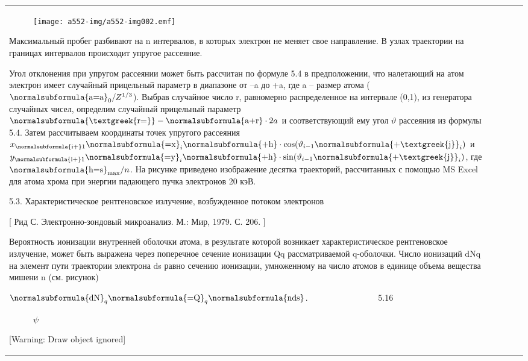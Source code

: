 \documentclass[a4paper,14pt, openany, twoside, draft]{extbook} %
\begin{document}
\begin{flushleft}
\begin{supertabular}{|m{1.7279999cm}|m{1.522cm}|m{1.522cm}|m{1.522cm}|m{1.744cm}|}
\begin{figure}
\centering
\texttt{[image: a552-img/a552-img002.emf]}
\end{figure}
Максимальный пробег разбивают на n интервалов, в которых электрон не меняет свое направление. В узлах траектории на границах интервалов происходит упругое рассеяние.

Угол отклонения при упругом рассеянии может быть рассчитан по формуле 5.4 в предположении, что налетающий на атом электрон имеет случайный прицельный параметр в диапазоне от –a до +a, где a – размер атома ( $\normalsubformula{\text{a=a}}_0/Z^{1/3}$). Выбрав случайное число r, равномерно распределенное на интервале (0,1), из генератора случайных чисел, определим случайный прицельный параметр  $\normalsubformula{\text{\textgreek{r=}}}-\normalsubformula{\text{a+r}}\cdot 2a$ и соответствующий ему угол  $\vartheta $ рассеяния из формулы 5.4. Затем рассчитываем координаты точек упругого рассеяния  $x_{\normalsubformula{\text{i+}}1}\normalsubformula{\text{=x}}_i\normalsubformula{\text{+h}}\cdot \text{cos}(\vartheta _{i-1}\normalsubformula{\text{+\textgreek{j}}}_i)$ и  $y_{\normalsubformula{\text{i+}}1}\normalsubformula{\text{=y}}_i\normalsubformula{\text{+h}}\cdot \text{sin}(\vartheta _{i-1}\normalsubformula{\text{+\textgreek{j}}}_i)$, где  $\normalsubformula{\text{h=s}}_{\text{max}}/n$. На рисунке приведено изображение десятка траекторий, рассчитанных с помощью MS Excel для атома хрома при энергии падающего пучка электронов 20 кэВ.

5.3. Характеристическое рентгеновское излучение, возбужденное потоком электронов

[ Рид С. Электронно-зондовый микроанализ. М.: Мир, 1979. С. 206. ]

Вероятность ионизации внутренней оболочки атома, в результате которой возникает характеристическое рентгеновское излучение, может быть выражена через поперечное сечение ионизации Qq рассматриваемой q{}-оболочки. Число ионизаций  dNq на элемент пути траектории электрона ds равно сечению ионизации, умноженному на число атомов в единице объема вещества мишени n (см. рисунок)

 $\normalsubformula{\text{dN}}_q\normalsubformula{\text{=Q}}_q\normalsubformula{\text{nds}}$. \ \ \ \ \ \ \ \ \ \ \ \ \ \ \ \ 5.16

\begin{figure}
\centering
\begin{minipage}{0.626cm}
${\psi}$
\end{minipage}
\end{figure}
[Warning: Draw object ignored]


\end{supertabular}
\end{flushleft}
\end{document}
